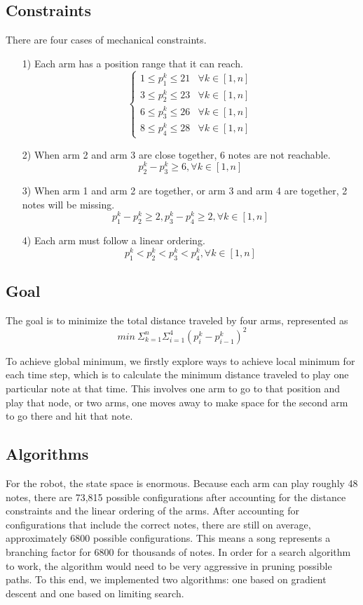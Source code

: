 \documentclass[letterpaper, 10 pt, conference]{ieeeconf}  %
\begin{document}
\subsection{Constraints}

There are four cases of mechanical constraints. 

\begin{itemize}
	\item[1)] Each arm has a position range that it can reach. 
		$$\left\lbrace\begin{array}{ll}
			1 \leq p^k_1 \leq 21	&	\forall k \in [1, n]		\\
			3 \leq p^k_2 \leq 23	&	\forall k \in [1, n]		\\
			6 \leq p^k_3 \leq 26	&	\forall k \in [1, n]		\\
			8 \leq p^k_4 \leq 28	&	\forall k \in [1, n]		
		\end{array}\right.		 $$
	\item[2)] When arm 2 and arm 3 are close together, 6 notes are not reachable. 
		$$p^k_2 - p^k_3 \geq 6, \forall k \in [1, n] $$
	\item[3)] When arm 1 and arm 2 are together, or arm 3 and arm 4 are together, 2 notes will  be missing. 
		$$p^k_1 - p^k_2 \geq 2, p^k_3 - p^k_4 \geq 2,  \forall k \in [1, n] $$
	\item[4)] Each arm must follow a linear ordering.
		$$p^k_1 < p^k_2 < p^k_3 < p^k_4, \forall k \in [1, n] $$
\end{itemize}

\subsection{Goal}

The goal is to minimize the total distance traveled by four arms, represented as
	$$min\ \Sigma_{k=1}^n \Sigma_{i=1}^4 (p^k_i - p^k_{i - 1})^2$$

To achieve global minimum, we firstly explore ways to achieve local minimum for each time step, which is to calculate the minimum distance traveled to play one particular note at that time. This involves one arm to go to that position and play that node, or two arms, one moves away to make space for the second arm to go there and hit that note.	


\subsection{Algorithms}

For the robot, the state space is enormous. Because each arm can play roughly 48 notes, there are 73,815 possible configurations after accounting for the distance constraints and the linear ordering of the arms. After accounting for configurations that include the correct notes, there are still on average, approximately 6800 possible configurations. This means a song represents a branching factor for 6800 for thousands of notes. In order for a search algorithm to work, the algorithm would need to be very aggressive in pruning possible paths. To this end, we implemented two algorithms: one based on gradient descent and one based on limiting search.
\end{document}
